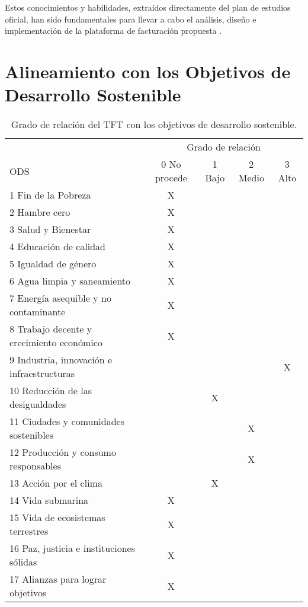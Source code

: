 \begin{large}
Estos conocimientos y habilidades, extraídos directamente del plan de estudios oficial, han sido fundamentales para llevar a cabo el análisis, diseño e implementación de la plataforma de facturación propuesta \cite{grado2024ulpgc}.

\end{large}

\section{Alineamiento con los Objetivos de Desarrollo Sostenible}

\begin{large}

\begin{table}[H]
\caption{Grado de relación del TFT con los objetivos de desarrollo sostenible.}
\label{tab:ODS}
\centering
\begin{tabular}{|l|c|c|c|c|}
\cline{1-5}
 & \multicolumn{4}{c|}{Grado de relación} \\ \cline{2-5}
ODS & 0 No procede & 1 Bajo & 2 Medio & 3 Alto \\ \cline{1-5}
1 Fin de la Pobreza                & X &   &   &   \\ \cline{1-5}
2 Hambre cero                      & X &   &   &   \\ \cline{1-5}
3 Salud y Bienestar                & X &   &   &   \\ \cline{1-5}
4 Educación de calidad             & X &   &   &   \\ \cline{1-5}
5 Igualdad de género               & X &   &   &   \\ \cline{1-5}
6 Agua limpia y saneamiento        & X &   &   &   \\ \cline{1-5}
7 Energía asequible y no contaminante & X &   &   &   \\ \cline{1-5}
8 Trabajo decente y crecimiento económico & X &   &   &   \\ \cline{1-5}
9 Industria, innovación e infraestructuras &   &   &   & X \\ \cline{1-5}
10 Reducción de las desigualdades  &   & X &   &   \\ \cline{1-5}
11 Ciudades y comunidades sostenibles &   &   & X &   \\ \cline{1-5}
12 Producción y consumo responsables &   &   & X &   \\ \cline{1-5} 
13 Acción por el clima             &   & X &   &   \\ \cline{1-5}
14 Vida submarina                  & X &   &   &   \\ \cline{1-5}
15 Vida de ecosistemas terrestres  & X &   &   &   \\ \cline{1-5}
16 Paz, justicia e instituciones sólidas & X &   &   &   \\ \cline{1-5}
17 Alianzas para lograr objetivos  & X &   &   &   \\ \cline{1-5}
\end{tabular}
\end{table}


\end{large}
